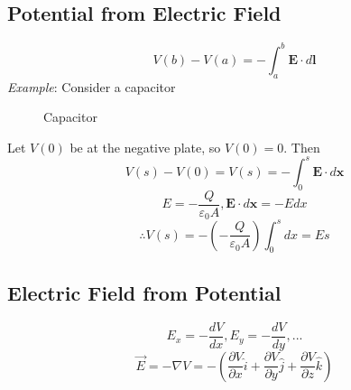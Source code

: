 \subsection{Potential from Electric Field}
$$V(b) - V(a)=-\int_a^b\mathbf{E}\cdot d\mathbf{l}$$
\emph{Example}:
Consider a capacitor
\begin{figure}[H]
    \centering
    
    \caption{Capacitor}
\end{figure}
Let $V(0)$ be at the negative plate, so $V(0)=0$. Then
$$V(s)-V(0)=V(s)=-\int_0^s\mathbf{E}\cdot d\mathbf{x}$$
$$E=-\frac{Q}{\varepsilon_0A},\mathbf{E}\cdot d\mathbf{x}=-Edx$$
$$\therefore V(s)=-(-\frac{Q}{\varepsilon_0A})\int_0^sdx=Es$$
\subsection{Electric Field from Potential}
$$E_x=-\frac{dV}{dx}, E_y=-\frac{dV}{dy},...$$
$$\Vec{E}=-\nabla V=-(\frac{\partial V}{\partial x}\hat{i}+\frac{\partial V}{\partial y}\hat{j}+\frac{\partial V}{\partial z}\hat{k})$$
